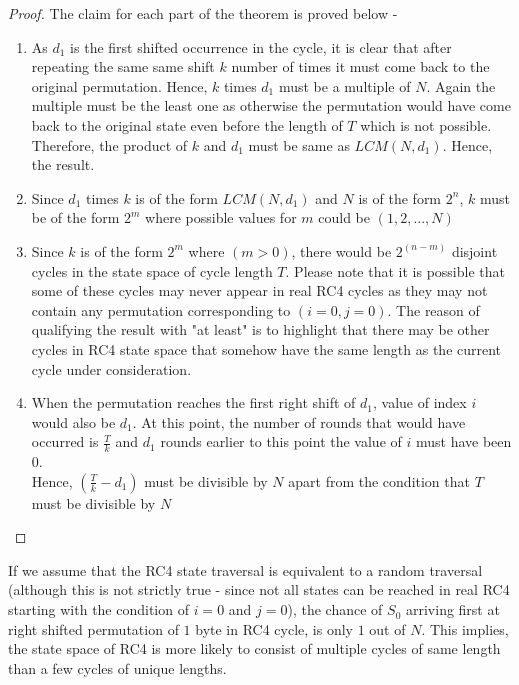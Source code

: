 \documentclass{llncs}
\begin{document}
\begin{proof}
The claim for each part of the theorem is proved below -\\
\begin{enumerate}
    \item \hspace As $d_1$ is the first shifted occurrence in the cycle, it is clear that after repeating the same same shift $k$ number of times it must come back to the original permutation. Hence, $k$ times $d_1$ must be a multiple of $N$. Again the multiple must be the least one as otherwise the permutation would have come back to the original state even before the length of $T$ which is not possible. Therefore, the product of $k$ and $d_1$ must be same as $LCM(N, d_1)$. Hence, the result.
    \item \hspace Since $d_1$ times $k$ is of the form $LCM(N, d_1)$ and $N$ is of the form $2^n$, $k$ must be of the form $2^m$ where possible values for $m$ could be $(1,2,...,N)$ \\
    \item \hspace Since $k$ is of the form $2^m$ where $(m>0)$, there would be $2^(n-m)$ disjoint cycles in the state space of cycle length $T$. Please note that it is possible that some of these cycles may never appear in real RC4 cycles as they may not contain any permutation corresponding to $(i=0, j=0)$. The reason of qualifying the result with "at least" is to highlight that there may be other cycles in RC4 state space that somehow have the same length as the current cycle under consideration. 
    \item \hspace When the permutation reaches the first right shift of $d_1$, value of index $i$ would also be $d_1$. At this point, the number of rounds that would have occurred is $\frac{T}{k}$ and $d_1$ rounds earlier to this point the value of $i$ must have been $0$. \\
    Hence, $(\frac{T}{k}-d_1)$ must be divisible by $N$ apart from the condition that $T$ must be divisible by $N$
\end{enumerate}
\end{proof}

If we assume that the RC4 state traversal is equivalent to a random traversal (although this is not strictly true - since not all states can be reached in real RC4 starting with the condition of $i=0$ and $j=0$), the chance of $S_0$ arriving first at right shifted permutation of $1$ byte in RC4 cycle, is only $1$ out of $N$. This implies, the state space of RC4 is more likely to consist of multiple cycles of same length than a few cycles of unique lengths.
\end{document}
